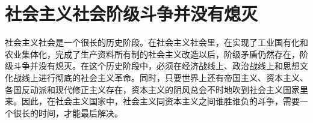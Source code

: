 \section[社会主义社会阶级斗争并没有熄灭（一九六四年）]{社会主义社会阶级斗争并没有熄灭}


社会主义社会是一个很长的历史阶段。在社会主义社会里，在实现了工业国有化和农业集体化，完成了生产资料所有制的社会主义改造以后，阶级矛盾仍然存在，阶级斗争并没有熄灭。在这个历史阶段中，必须在经济战线上、政治战线上和思想文化战线上进行彻底的社会主义革命。同时，只要世界上还有帝国主义、资本主义、各国反动派和现代修正主义存在，资本主义的阴风总会不时地吹到社会主义国家里来。因此，在社会主义国家中，社会主义同资本主义之间谁胜谁负的斗争，需要一个很长的时间，才能最后解决。


